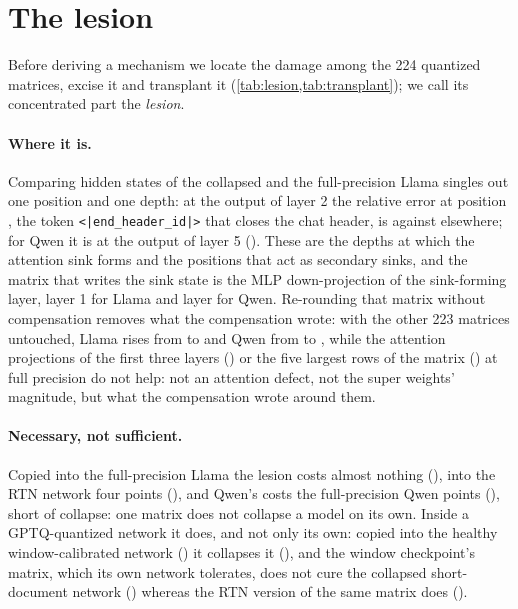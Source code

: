 \section{The lesion}
\label{sec:lesion}
Before deriving a mechanism we locate the damage among the 224 quantized matrices, excise it and transplant it (\cref{tab:lesion,tab:transplant}); we call its concentrated part the \emph{lesion}.

\paragraph{Where it is.}
Comparing hidden states of the collapsed and the full-precision Llama singles out one position and one depth: at the output of layer 2 the relative error at position \LlesionPos{}, the token \texttt{<|end\_header\_id|>} that closes the chat header, is \LposErr{} against \LposErrRest{} elsewhere; for Qwen it is \QsinkTok{} at the output of layer 5 (\QposErr{}).
These are the depths at which the attention sink forms and the positions that act as secondary sinks, and the matrix that writes the sink state is the MLP down-projection of the sink-forming layer, layer 1 for Llama and layer \QlesionLayer{} for Qwen.
Re-rounding that matrix without compensation removes what the compensation wrote: with the other 223 matrices untouched, Llama rises from \LgptqIF{} to \LoneMatrixIF{} and Qwen from \QgptqIF{} to \QoneMatrixIF{}, while the attention projections of the first three layers (\LearlyAttnIF{}) or the five largest rows of the matrix (\LswRowsIF{}) at full precision do not help: not an attention defect, not the super weights' magnitude, but what the compensation wrote around them.

\paragraph{Necessary, not sufficient.}
Copied into the full-precision Llama the lesion costs almost nothing (\TPfp{}), into the RTN network four points (\TPrtn{}), and Qwen's costs the full-precision Qwen \TPqfpDrop{} points (\TPqfp{}), short of collapse: one matrix does not collapse a model on its own.
Inside a GPTQ-quantized network it does, and not only its own: copied into the healthy window-calibrated network (\LcwinIF{}) it collapses it (\TPcwin{}), and the window checkpoint's matrix, which its own network tolerates, does not cure the collapsed short-document network (\TPshort{}) whereas the RTN version of the same matrix does (\LoneMatrixIF{}).
